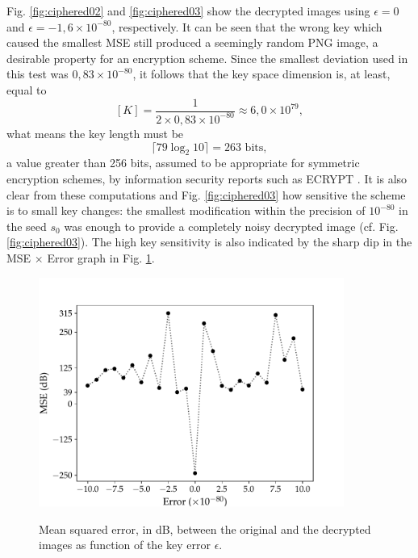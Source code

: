 Fig. \ref{fig:ciphered02} and \ref{fig:ciphered03} show the decrypted images using $ \epsilon = 0 $ and $ \epsilon = -1{,}6 \times 10^{-80} $, respectively. It can be seen that the wrong key which caused the smallest MSE still produced a seemingly random PNG image, a desirable property for an encryption scheme. Since the smallest deviation used in this test was $ 0{,}83 \times 10^{-80} $, it follows that the key space dimension is, at least, equal to
\begin{equation}
[K] = \frac{1}{2 \times 0{,}83 \times 10^{-80}} \approx 6{,}0 \times 10^{79},
\end{equation}
what means the key length must be
\begin{equation}
\lceil 79 \log_2 10 \rceil = 263\text{ bits},
\end{equation}
a value greater than 256 bits, assumed to be appropriate for symmetric encryption schemes, by information security reports such as ECRYPT \cite{smart2018algorithms}. It is also clear from these computations and Fig. \ref{fig:ciphered03} how sensitive the scheme is to small key changes: the smallest modification within the precision of $ 10^{-80} $ in the seed $ s_0 $ was enough to provide a completely noisy decrypted image (cf. Fig. \ref{fig:ciphered03}). The high key sensitivity is also indicated by the sharp dip in the MSE $\times $ Error graph in Fig. \ref{fig:MSE}.
%
%
\begin{figure}
\centering
\caption{Mean squared error, in dB, between the original and the decrypted images as function of the key error $ \epsilon $.}
\includegraphics[width=10cm]{Figures/MSEdb_FrQDFT_EN.pdf}
\floatsource
\label{fig:MSE}
\end{figure}
%

